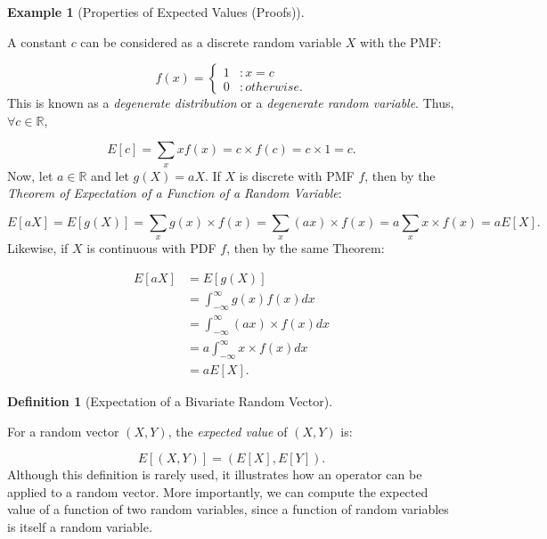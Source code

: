 \documentclass[
]{article}
\theoremstyle{definition}
\newtheorem{definition}{Definition}[section]
\theoremstyle{definition}
\newtheorem{example}{Example}[section]
\theoremstyle{definition}
\theoremstyle{remark}
\begin{document}
\begin{example}[Properties of Expected Values (Proofs)]
\protect\hypertarget{exm:unlabeled-div-60}{}\label{exm:unlabeled-div-60}

A constant \(c\) can be considered as a discrete random variable \(X\) with the PMF:

\[
f(x) = 
  \begin{cases}
  1 &: x = c \\
  0 &: otherwise.
  \end{cases}
\]
This is known as a \emph{degenerate distribution} or a \emph{degenerate random variable}. Thus, \(\forall c \in \mathbb{R}\),

\[E[c] = \sum_xxf(x) = c \times f(c) = c \times 1 = c.\]
Now, let \(a \in \mathbb{R}\) and let \(g(X) = aX\). If \(X\) is discrete with PMF \(f\), then by the \emph{Theorem of Expectation of a Function of a Random Variable}:

\[E[aX] = E[g(X)] = \sum_xg(x) \times f(x) = \sum_x(ax) \times f(x) = a \sum_x x \times f(x) = aE[X].\]
Likewise, if \(X\) is continuous with PDF \(f\), then by the same Theorem:

\begin{align}
E[aX] &= E[g(X)] \\
      &= \int_{-\infty}^{\infty} g(x)f(x)dx \\
      &= \int_{-\infty}^{\infty} (ax) \times f(x)dx \\
      &= a \int_{-\infty}^{\infty} x \times f(x)dx \\
      &= aE[X].
\end{align}

\end{example}

\begin{definition}[Expectation of a Bivariate Random Vector]
\protect\hypertarget{def:unlabeled-div-61}{}\label{def:unlabeled-div-61}

For a random vector \((X,Y)\), the \emph{expected value} of \((X,Y)\) is:

\[E[(X,Y)] = (E[X], E[Y]).\]
Although this definition is rarely used, it illustrates how an operator can be applied to a random vector. More importantly, we can compute the expected value of a function of two random variables, since a function of random variables is itself a random variable.

\end{definition}
\end{document}
